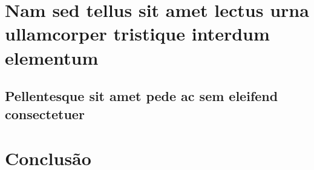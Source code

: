 \documentclass[
	12pt,				%
	openright,			%
    twoside,			%
	a4paper,			%
	english,			%
	french,				%
	spanish,			%
	brazil				%
	]{abntex2}
\numberwithin{lema}{chapter}
\numberwithin{teorema}{chapter}
\numberwithin{definicao}{chapter}
\numberwithin{figure}{chapter}
\begin{document}


\chapter{Nam sed tellus sit amet lectus urna ullamcorper tristique interdum
elementum}

\section{Pellentesque sit amet pede ac sem eleifend consectetuer}

\lipsum[24]


\chapter{Conclusão}

\lipsum[31-33]

\fi

\postextual



%
%

\end{document}
